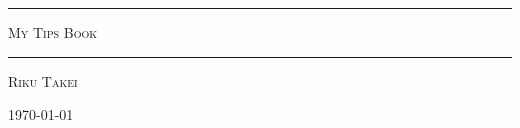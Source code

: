 \begin{titlepage}

\centering

\rule[2.0mm]{0.5\textwidth}{0.5mm}

\begin{doublespace}
    {\Huge \scshape My Tips Book}
\end{doublespace}

\rule[2.0mm]{0.5\textwidth}{0.5mm}

\vspace{2.0mm}
{\Large \scshape Riku Takei}

\vfill


\vspace{10.0mm}
{\normalsize \today}

\end{titlepage}

